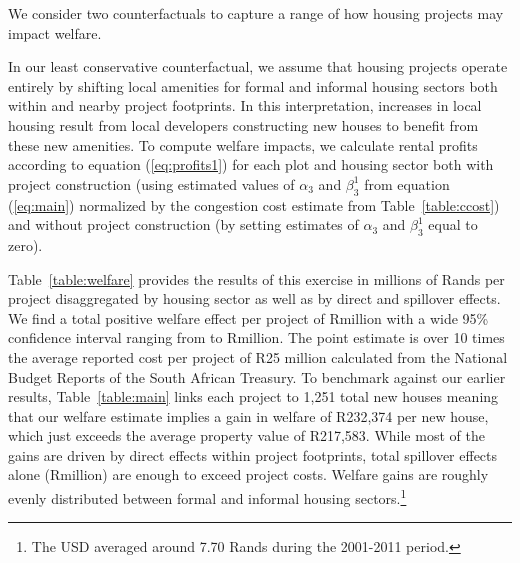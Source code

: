 \documentclass[12pt]{article}
\begin{document}
We consider two counterfactuals to capture a range of how housing projects may impact welfare.  

In our least conservative counterfactual, we assume that housing projects operate entirely by shifting local amenities for formal and informal housing sectors both within and nearby project footprints.  In this interpretation, increases in local housing result from local developers constructing new houses to benefit from these new amenities.  To compute welfare impacts, we calculate rental profits according to equation (\ref{eq:profits1}) for each plot and housing sector both with project construction (using estimated values of $\alpha_3$ and $\beta_3^{1}$ from equation (\ref{eq:main}) normalized by the congestion cost estimate from Table~\ref{table:ccost}) and without project construction (by setting estimates of $\alpha_3$ and $\beta_3^{1}$ equal to zero).  

Table~\ref{table:welfare} provides the results of this exercise in millions of Rands per project disaggregated by housing sector as well as by direct and spillover effects.  We find a total positive welfare effect per project of Rmillion with a wide 95\% confidence interval ranging from to Rmillion.  The point estimate is over 10 times the average reported cost per project of R25 million calculated from the National Budget Reports of the South African Treasury. To benchmark against our earlier results, Table~\ref{table:main} links each project to 1,251 total new houses meaning that our welfare estimate implies a gain in welfare of R232,374 per new house, which just exceeds the average property value of R217,583.  While most of the gains are driven by direct effects within project footprints, total spillover effects alone (Rmillion) are enough to exceed project costs.  Welfare gains are roughly evenly distributed between formal and informal housing sectors.\footnote{The USD averaged around 7.70 Rands during the 2001-2011 period.}
\end{document}
